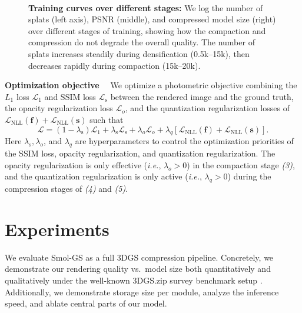 \documentclass{article}
\def\vf{{\bm{f}}}
\def\vs{{\bm{s}}}
\newlength{\figurewidth}
\newlength{\figureheight}
\newcommand{\ours}{Smol-GS\xspace}
\newcommand{\ie}{\textit{i.e.}\xspace}
\newcommand{\figpath}{./jpeg/fig}
\renewcommand{\paragraph}[1]{\noindent\textbf{#1}~~}
\begin{document}
\begin{figure}[t!]
  \centering\tiny
  \setlength{\figurewidth}{.75\textwidth}
  \setlength{\figureheight}{.35\textwidth}
  \\
  \vspace*{-.1in}
  \caption{\textbf{Training curves over different stages:} We log the number of splats (left axis), PSNR (middle), and compressed model size (right) over different stages of training, showing how the compaction and compression do not degrade the overall quality. The number of splats increases steadily during densification (0.5k--15k), then decreases rapidly during compaction (15k--20k).}
  \label{fig:training_curves}
  \vspace*{-1.5em}
\end{figure}


\paragraph{Optimization objective} 
We optimize a photometric objective combining the $L_1$ loss $\mathcal{L}_1$ and SSIM loss $\mathcal{L}_\text{s}$ between the rendered image and the ground truth, the opacity regularization loss $\mathcal{L}_{o}$, and the quantization regularization losses of $\mathcal{L}_\text{NLL}(\vf)+ \mathcal{L}_\text{NLL}(\vs)$ such that
\begin{equation}
  \label{eq:training_loss}
\mathcal{L} = (1-\lambda_\text{s}) \mathcal{L}_1 + \lambda_\text{s} \mathcal{L}_\text{s} + \lambda_{o} \mathcal{L}_{o} + \lambda_{q}\left[\mathcal{L}_\text{NLL}(\vf)+ \mathcal{L}_\text{NLL}(\vs)\right].
\end{equation}
Here $\lambda_\text{s}, \lambda_{o}$, and $\lambda_{q}$ are hyperparameters to control the optimization priorities of the SSIM loss, opacity regularization, and quantization regularization. The opacity regularization is only effective (\ie, $\lambda_{o}>0$) in the compaction stage {\em (3)}, and the quantization regularization is only active (\ie, $\lambda_{q}>0$) during the compression stages of {\em (4)} and {\em (5)}.




%
%
%
%
%
%
%
%
%
%
%
%
%
%
%
%
%
%
%
%
%
%

%
%
%
%
%





%
\section{Experiments}
\label{sec:experiments}
%
We evaluate \ours as a full 3DGS compression pipeline. Concretely, we demonstrate our rendering quality vs.\ model size both quantitatively and qualitatively under the well-known 3DGS.zip survey benchmark setup \cite{bagdasarian20253dgszip}. Additionally, we demonstrate storage size per module, analyze the inference speed, and ablate central parts of our model.
\end{document}
